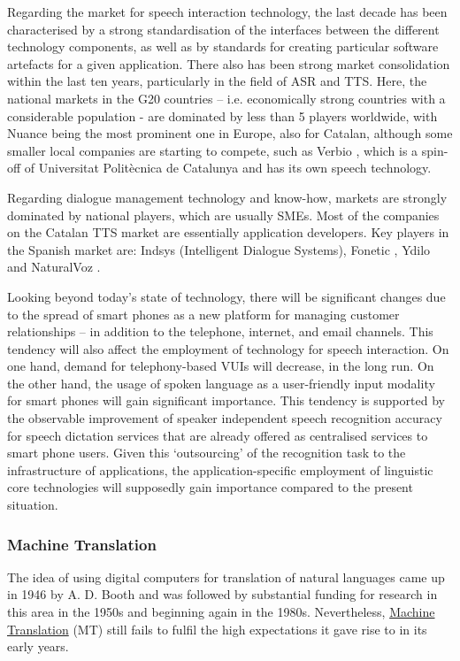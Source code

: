 \documentclass[]{../../metanetpaper}
\begin{document}
\begin{multicols}{2}
Regarding the market for speech interaction technology, the last decade has been characterised by a strong standardisation of the interfaces between the different technology components, as well as by standards for creating particular software artefacts for a given application. There also has been strong market consolidation within the last ten years, particularly in the field of ASR and TTS. Here, the national markets in the G20 countries – i.e. economically strong countries with a considerable population - are dominated by less than 5 players worldwide, with Nuance being the most prominent one in Europe, also for Catalan, although some smaller local companies are starting to compete, such as Verbio \cite{CAT-Nota25}, which is a spin-off of Universitat Politècnica de Catalunya and has its own speech technology. 

Regarding dialogue management technology and know-how, markets are strongly dominated by national players, which are usually SMEs. Most of the companies on the Catalan TTS market are essentially application developers. Key players in the Spanish market are: Indsys \cite{CAT-Nota26} (Intelligent Dialogue Systems), Fonetic \cite{CAT-Nota27}, Ydilo \cite{CAT-Nota28} and NaturalVoz \cite{CAT-Nota29}.

Looking beyond today’s state of technology, there will be significant changes due to the spread of smart phones as a new platform for managing customer relationships – in addition to the telephone, internet, and email channels. This tendency will also affect the employment of technology for speech interaction. On one hand, demand for telephony-based VUIs will decrease, in the long run. On the other hand, the usage of spoken language as a user-friendly input modality for smart phones will gain significant importance. This tendency is supported by the observable improvement of speaker independent speech recognition accuracy for speech dictation services that are already offered as centralised services to smart phone users. Given this ‘outsourcing’ of the recognition task to the infrastructure of applications, the application-specific employment of linguistic core technologies will supposedly gain importance compared to the present situation. 

\subsubsection{Machine Translation}

The idea of using digital computers for translation of natural languages came up in 1946 by A. D. Booth and was followed by substantial funding for research in this area in the 1950s and beginning again in the 1980s. Nevertheless, \underline{Machine Translation} (MT) still fails to fulfil the high expectations it gave rise to in its early years. 


\end{multicols}
\end{document}
